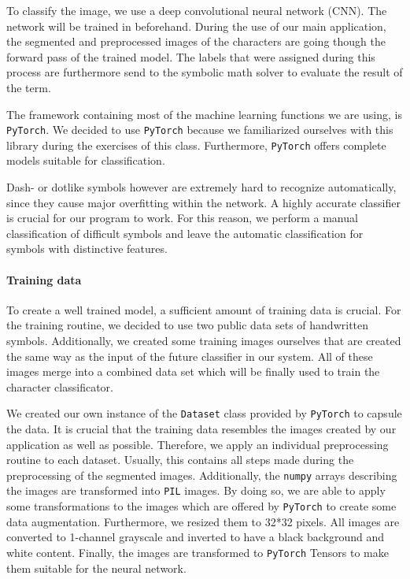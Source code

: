 \documentclass[12pt]{article}
\begin{document}
	To classify the image, we use a deep convolutional neural network (CNN). The network will be trained in beforehand. During the use of our main application, the segmented and preprocessed images of the characters are going though the forward pass of the trained model. The labels that were assigned during this process are furthermore send to the symbolic math solver to evaluate the result of the term. 
	
	The framework containing most of the machine learning functions we are using, is \texttt{PyTorch}. We decided to use \texttt{PyTorch} because we familiarized ourselves with this library during the exercises of this class. Furthermore, \texttt{PyTorch} offers complete models suitable for classification.
		
	Dash- or dotlike symbols however are extremely hard to recognize automatically, since they cause major overfitting within the network. A highly accurate classifier is crucial for our program to work. For this reason, we perform a manual classification of difficult symbols and leave the automatic classification for symbols with distinctive features.
	
	\paragraph{Training data}
		To create a well trained model, a sufficient amount of training data is crucial. For the training routine, we decided to use two public data sets of handwritten symbols. Additionally, we created some training images ourselves that are created the same way as the input of the future classifier in our system. All of these images merge into a combined data set which will be finally used to train the character classificator.
		
		We created our own instance of the \texttt{Dataset} class provided by \texttt{PyTorch} to capsule the data. It is crucial that the training data resembles the images created by our application as well as possible. Therefore, we apply an individual preprocessing routine to each dataset. Usually, this contains all steps made during the preprocessing of the segmented images. Additionally, the \texttt{numpy} arrays describing the images are transformed into \texttt{PIL} images. By doing so, we are able to apply some transformations to the images which are offered by \texttt{PyTorch} to create some data augmentation. Furthermore, we resized them to 32*32 pixels. All images are converted to 1-channel grayscale and inverted to have a black background and white content. Finally, the images are transformed to \texttt{PyTorch} Tensors to make them suitable for the neural network. 
		
\end{document}
